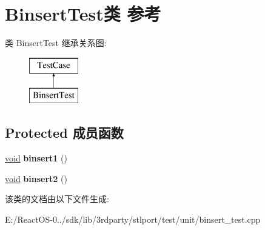 \hypertarget{class_binsert_test}{}\section{Binsert\+Test类 参考}
\label{class_binsert_test}
类 Binsert\+Test 继承关系图\+:\begin{figure}[H]
\begin{center}
\leavevmode
\includegraphics[height=2.000000cm]{class_binsert_test}
\end{center}
\end{figure}
\subsection*{Protected 成员函数}
\begin{DoxyCompactItemize}
\item 
\mbox{\label{class_binsert_test_a3d95c33f63ab273fe377eac6dc42c9dc}} 
\hyperlink{interfacevoid}{void} {\bfseries binsert1} ()
\item 
\mbox{\label{class_binsert_test_a8079f6cec53fa862e84ba6f7c4d3327a}} 
\hyperlink{interfacevoid}{void} {\bfseries binsert2} ()
\end{DoxyCompactItemize}


该类的文档由以下文件生成\+:\begin{DoxyCompactItemize}
\item 
E\+:/\+React\+O\+S-\/0../sdk/lib/3rdparty/stlport/test/unit/binsert\+\_\+test.\+cpp\end{DoxyCompactItemize}
